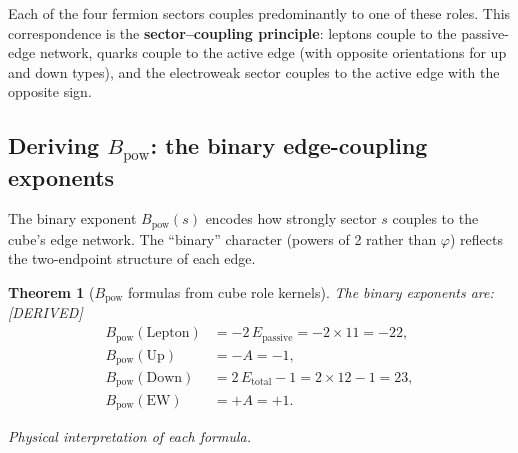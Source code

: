 \documentclass[11pt,a4paper]{article}
\newtheorem{theorem}{Theorem}[section]
\theoremstyle{definition}
\theoremstyle{remark}
\newcommand{\phig}{\varphi}
\newcommand{\Epass}{E_{\mathrm{passive}}}
\newcommand{\Etot}{E_{\mathrm{total}}}
\newcommand{\DERIVED}{\textcolor{blue!70!black}{\footnotesize\textsf{[DERIVED]}}}
\begin{document}
Each of the four fermion sectors couples predominantly to one of these roles.
This correspondence is the \textbf{sector--coupling principle}: leptons couple
to the passive-edge network, quarks couple to the active edge (with opposite
orientations for up and down types), and the electroweak sector couples to the
active edge with the opposite sign.

\subsection{Deriving $B_{\mathrm{pow}}$: the binary edge-coupling exponents}

The binary exponent $B_{\mathrm{pow}}(s)$ encodes how strongly sector $s$
couples to the cube's edge network.  The ``binary'' character (powers of 2
rather than $\phig$) reflects the two-endpoint structure of each edge.

\begin{theorem}[$B_{\mathrm{pow}}$ formulas from cube role kernels]
\label{thm:Bpow}
The binary exponents are: \DERIVED{}
\begin{equation}
\begin{aligned}
  B_{\mathrm{pow}}(\text{Lepton})
    &= -2\,\Epass = -2 \times 11 = -22, \\
  B_{\mathrm{pow}}(\text{Up})
    &= -A = -1, \\
  B_{\mathrm{pow}}(\text{Down})
    &= 2\,\Etot - 1 = 2 \times 12 - 1 = 23, \\
  B_{\mathrm{pow}}(\text{EW})
    &= +A = +1.
\end{aligned}
\label{eq:Bpow}
\end{equation}
\end{theorem}

\noindent\textit{Physical interpretation of each formula.}
\end{document}
